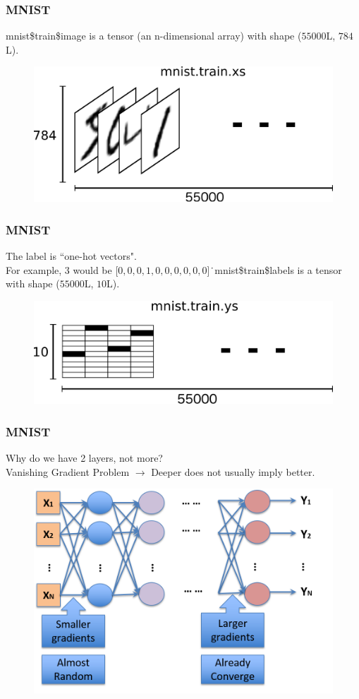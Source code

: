 \documentclass{beamer}
\begin{document}
\begin{frame}
	\frametitle{MNIST}
mnist\$train\$image is a tensor (an n-dimensional array) with shape ($55000$L, $784$L). 
	\begin{figure}
		\includegraphics[width=0.8\linewidth]{MNIST2}
	\end{figure}
\end{frame}


\begin{frame}
	\frametitle{MNIST}
	The label is ``one-hot vectors". \\
	For example, $3$ would be [$0,0,0,1,0,0,0,0,0,0$]\.\
	mnist\$train\$labels is a tensor with shape ($55000$L, $10$L). 
	\begin{figure}
		\includegraphics[width=0.8\linewidth]{MNIST3}
	\end{figure}
\end{frame}

\begin{frame}
	\frametitle{MNIST}
	Why do we have 2 layers, not more?\\
	Vanishing Gradient Problem $\longrightarrow$ Deeper does not usually imply better.
	\begin{figure}
		\includegraphics[width=0.8\linewidth]{Picture14}
	\end{figure}
\end{frame}
\end{document}
